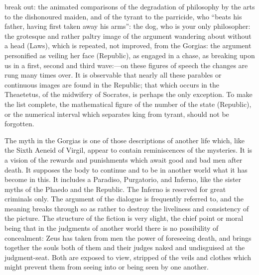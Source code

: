 \documentclass[11pt,letter]{article}
\begin{document}
break out: the animated comparisons of the degradation of philosophy by the arts to the dishonoured maiden, and of the tyrant to the parricide, who “beats his father, having first taken away his arms”: the dog, who is your only philosopher: the grotesque and rather paltry image of the argument wandering about without a head (Laws), which is repeated, not improved, from the Gorgias: the argument personified as veiling her face (Republic), as engaged in a chase, as breaking upon us in a first, second and third wave:—on these figures of speech the changes are rung many times over. It is observable that nearly all these parables or continuous images are found in the Republic; that which occurs in the Theaetetus, of the midwifery of Socrates, is perhaps the only exception. To make the list complete, the mathematical figure of the number of the state (Republic), or the numerical interval which separates king from tyrant, should not be forgotten.

\par  The myth in the Gorgias is one of those descriptions of another life which, like the Sixth Aeneid of Virgil, appear to contain reminiscences of the mysteries. It is a vision of the rewards and punishments which await good and bad men after death. It supposes the body to continue and to be in another world what it has become in this. It includes a Paradiso, Purgatorio, and Inferno, like the sister myths of the Phaedo and the Republic. The Inferno is reserved for great criminals only. The argument of the dialogue is frequently referred to, and the meaning breaks through so as rather to destroy the liveliness and consistency of the picture. The structure of the fiction is very slight, the chief point or moral being that in the judgments of another world there is no possibility of concealment: Zeus has taken from men the power of foreseeing death, and brings together the souls both of them and their judges naked and undisguised at the judgment-seat. Both are exposed to view, stripped of the veils and clothes which might prevent them from seeing into or being seen by one another.
\end{document}
